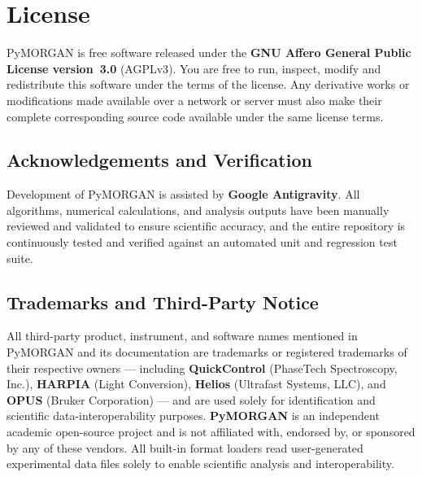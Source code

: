\documentclass[11pt,a4paper]{article}
\begin{document}
\section{License}\label{sec:license}
PyMORGAN is free software released under the \textbf{GNU Affero General Public License version~3.0} (\textsf{AGPLv3}).
You are free to run, inspect, modify and redistribute this software under the terms of the license. Any derivative works or modifications made available over a network or server must also make their complete corresponding source code available under the same license terms.

\subsection*{Acknowledgements and Verification}
Development of PyMORGAN is assisted by \textbf{Google Antigravity}. All algorithms, numerical calculations, and analysis outputs have been manually reviewed and validated to ensure scientific accuracy, and the entire repository is continuously tested and verified against an automated unit and regression test suite.

\subsection*{Trademarks and Third-Party Notice}
All third-party product, instrument, and software names mentioned in PyMORGAN and its documentation are trademarks or registered trademarks of their respective owners --- including \textbf{QuickControl} (PhaseTech Spectroscopy, Inc.), \textbf{HARPIA} (Light Conversion), \textbf{Helios} (Ultrafast Systems, LLC), and \textbf{OPUS} (Bruker Corporation) --- and are used solely for identification and scientific data-interoperability purposes. \textbf{PyMORGAN} is an independent academic open-source project and is not affiliated with, endorsed by, or sponsored by any of these vendors. All built-in format loaders read user-generated experimental data files solely to enable scientific analysis and interoperability.
\end{document}

